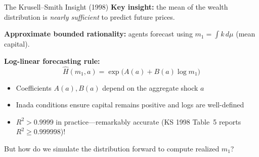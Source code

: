 \documentclass[aspectratio=169,11pt]{beamer}
\newcommand{\emphc}[1]{\textcolor{harvardcrimson}{#1}}
\begin{document}
\begin{frame}{The Krusell--Smith Insight (1998)}
\textbf{Key insight:} the \emphc{mean} of the wealth distribution is \emph{nearly sufficient} to predict future prices.

\vspace{0.5em}
\textbf{Approximate bounded rationality:} agents forecast using $m_1 = \int k \, d\mu$ (mean capital).

\vspace{0.5em}
\textbf{Log-linear forecasting rule:}
\[
\boxed{\hat{H}(m_1, a) = \exp\!\bigl(A(a) + B(a) \log m_1\bigr)}
\]

\vspace{0.3em}
\begin{itemize}
    \item Coefficients $A(a), B(a)$ depend on the aggregate shock $a$
    \item Inada conditions ensure capital remains positive and logs are well-defined
    \item $R^2 > 0.9999$ in practice---remarkably accurate (KS 1998 Table~5 reports $R^2 \geq 0.999998$)!
\end{itemize}

\vspace{0.3em}
{\small But \emphc{how do we simulate} the distribution forward to compute realized $m_1$?}
\end{frame}
\end{document}
